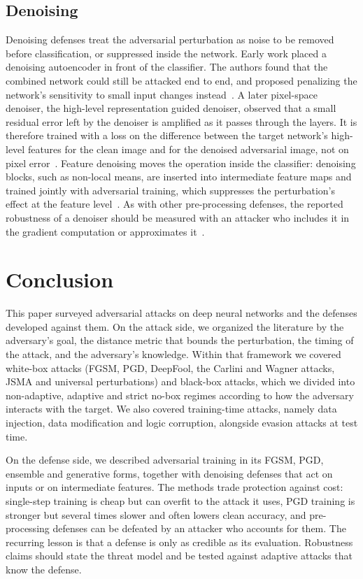 \documentclass[12pt]{article}
\begin{document}
\subsection{Denoising}

Denoising defenses treat the adversarial perturbation as noise to be removed before classification, or suppressed inside the network. Early work placed a denoising autoencoder in front of the classifier. The authors found that the combined network could still be attacked end to end, and proposed penalizing the network's sensitivity to small input changes instead~\cite{gu2015}. A later pixel-space denoiser, the high-level representation guided denoiser, observed that a small residual error left by the denoiser is amplified as it passes through the layers. It is therefore trained with a loss on the difference between the target network's high-level features for the clean image and for the denoised adversarial image, not on pixel error~\cite{liao2018}. Feature denoising moves the operation inside the classifier: denoising blocks, such as non-local means, are inserted into intermediate feature maps and trained jointly with adversarial training, which suppresses the perturbation's effect at the feature level~\cite{xie2019feature}. As with other pre-processing defenses, the reported robustness of a denoiser should be measured with an attacker who includes it in the gradient computation or approximates it~\cite{athalye2018}.

\section{Conclusion}

This paper surveyed adversarial attacks on deep neural networks and the defenses developed against them. On the attack side, we organized the literature by the adversary's goal, the distance metric that bounds the perturbation, the timing of the attack, and the adversary's knowledge. Within that framework we covered white-box attacks (FGSM, PGD, DeepFool, the Carlini and Wagner attacks, JSMA and universal perturbations) and black-box attacks, which we divided into non-adaptive, adaptive and strict no-box regimes according to how the adversary interacts with the target. We also covered training-time attacks, namely data injection, data modification and logic corruption, alongside evasion attacks at test time.

On the defense side, we described adversarial training in its FGSM, PGD, ensemble and generative forms, together with denoising defenses that act on inputs or on intermediate features. The methods trade protection against cost: single-step training is cheap but can overfit to the attack it uses, PGD training is stronger but several times slower and often lowers clean accuracy, and pre-processing defenses can be defeated by an attacker who accounts for them. The recurring lesson is that a defense is only as credible as its evaluation. Robustness claims should state the threat model and be tested against adaptive attacks that know the defense.
\end{document}
